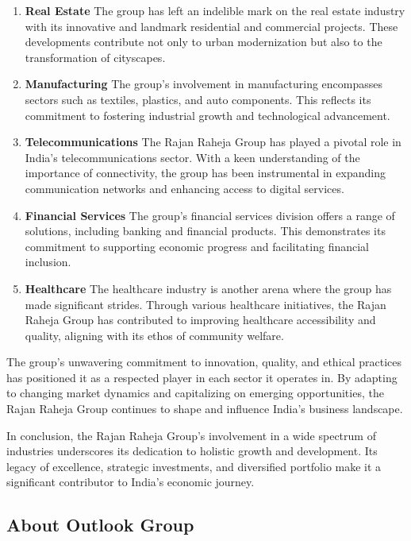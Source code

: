 \begin{enumerate}


\item \textbf{Real Estate}
The group has left an indelible mark on the real estate industry with its innovative and landmark residential and commercial projects. These developments contribute not only to urban modernization but also to the transformation of cityscapes.

\item \textbf{Manufacturing}
The group's involvement in manufacturing encompasses sectors such as textiles, plastics, and auto components. This reflects its commitment to fostering industrial growth and technological advancement.

\item \textbf{Telecommunications}
The Rajan Raheja Group has played a pivotal role in India's telecommunications sector. With a keen understanding of the importance of connectivity, the group has been instrumental in expanding communication networks and enhancing access to digital services.

\item \textbf{Financial Services}
The group's financial services division offers a range of solutions, including banking and financial products. This demonstrates its commitment to supporting economic progress and facilitating financial inclusion.

\item \textbf{Healthcare}
The healthcare industry is another arena where the group has made significant strides. Through various healthcare initiatives, the Rajan Raheja Group has contributed to improving healthcare accessibility and quality, aligning with its ethos of community welfare.
\end{enumerate}
The group's unwavering commitment to innovation, quality, and ethical practices has positioned it as a respected player in each sector it operates in. By adapting to changing market dynamics and capitalizing on emerging opportunities, the Rajan Raheja Group continues to shape and influence India's business landscape.

In conclusion, the Rajan Raheja Group's involvement in a wide spectrum of industries underscores its dedication to holistic growth and development. Its legacy of excellence, strategic investments, and diversified portfolio make it a significant contributor to India's economic journey.\citep{gowda2009green}

\subsection{About Outlook Group}


